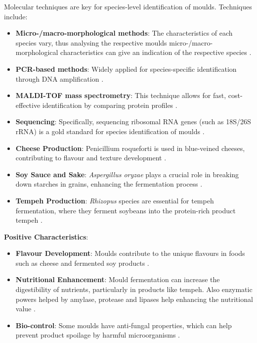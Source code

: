 Molecular techniques are key for species-level identification of moulds. Techniques include:
\begin{itemize}
    \item \textbf{Micro-/macro-morphological methods}: The characteristics of each species vary, thus analysing the respective moulds micro-/macro-morphological characteristics can give an indication of the respective species \cite*{LabManual}.
    \item \textbf{PCR-based methods}: Widely applied for species-specific identification through DNA amplification \cite*{L1-DiversityMicro}.
    \item \textbf{MALDI-TOF mass spectrometry}: This technique allows for fast, cost-effective identification by comparing protein profiles \cite*{L9-Coryn}.
    \item \textbf{Sequencing}: Specifically, sequencing ribosomal RNA genes (such as 18S/26S rRNA) is a gold standard for species identification of moulds \cite*{L3-SeqBasedClass}.
\end{itemize}

\begin{itemize}
    \item \textbf{Cheese Production}: Penicillium roqueforti is used in blue-veined cheeses, contributing to flavour and texture development \cite*{L8-MicroInFood}.
    \item \textbf{Soy Sauce and Sake}: \textit{Aspergillus oryzae} plays a crucial role in breaking down starches in grains, enhancing the fermentation process \cite*{L1-DiversityMicro}.
    \item \textbf{Tempeh Production}: \textit{Rhizopus} species are essential for tempeh fermentation, where they ferment soybeans into the protein-rich product tempeh \cite*{L1-DiversityMicro}.
\end{itemize}

\textbf{Positive Characteristics}:
\begin{itemize}
    \item \textbf{Flavour Development}: Moulds contribute to the unique flavours in foods such as cheese and fermented soy products \cite*{LS03}.
    \item \textbf{Nutritional Enhancement}: Mould fermentation can increase the digestibility of nutrients, particularly in products like tempeh. Also enzymatic powers helped by amylase, protease and lipases help enhancing the nutritional value \cite*{L1-DiversityMicro,LS03}.
    \item \textbf{Bio-control}: Some moulds have anti-fungal properties, which can help prevent product spoilage by harmful microorganisms \cite*{L1-DiversityMicro}.
\end{itemize}

